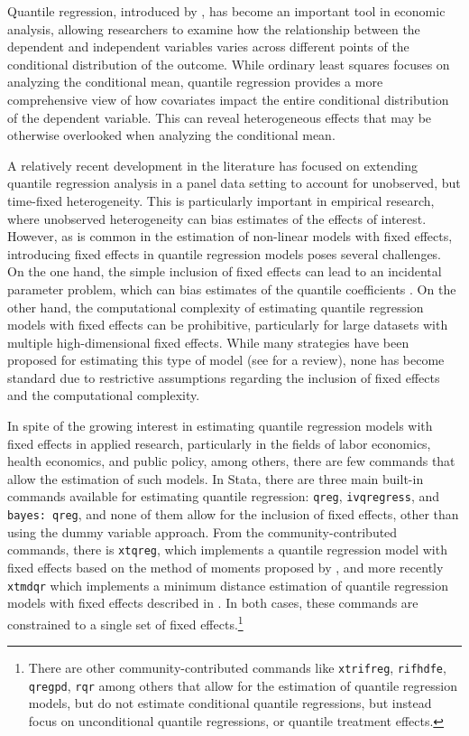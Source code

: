 \documentclass[bib]{statapress}
\begin{document}
Quantile regression, introduced by \citet{koenker1978}, has become an
important tool in economic analysis, allowing researchers to examine how
the relationship between the dependent and independent variables varies
across different points of the conditional distribution of the outcome.
While ordinary least squares focuses on analyzing the conditional mean,
quantile regression provides a more comprehensive view of how covariates
impact the entire conditional distribution of the dependent variable.
This can reveal heterogeneous effects that may be otherwise overlooked
when analyzing the conditional mean.

A relatively recent development in the literature has focused on
extending quantile regression analysis in a panel data setting to
account for unobserved, but time-fixed heterogeneity. This is
particularly important in empirical research, where unobserved
heterogeneity can bias estimates of the effects of interest. However, as
is common in the estimation of non-linear models with fixed effects,
introducing fixed effects in quantile regression models poses several
challenges. On the one hand, the simple inclusion of fixed effects can
lead to an incidental parameter problem, which can bias estimates of the
quantile coefficients \citep{neymanscott1948, lancaster2000}. On the
other hand, the computational complexity of estimating quantile
regression models with fixed effects can be prohibitive, particularly
for large datasets with multiple high-dimensional fixed effects. While
many strategies have been proposed for estimating this type of model
(see \citet{galvao2017quantile} for a review), none has become standard
due to restrictive assumptions regarding the inclusion of fixed effects
and the computational complexity.

In spite of the growing interest in estimating quantile regression
models with fixed effects in applied research, particularly in the
fields of labor economics, health economics, and public policy, among
others, there are few commands that allow the estimation of such models.
In Stata, there are three main built-in commands available for
estimating quantile regression: \texttt{qreg}, \texttt{ivqregress}, and
\texttt{bayes:\ qreg}, and none of them allow for the inclusion of fixed
effects, other than using the dummy variable approach. From the
community-contributed commands, there is \texttt{xtqreg}, which
implements a quantile regression model with fixed effects based on the
method of moments proposed by \citet{mss2019}, and more recently
\texttt{xtmdqr} which implements a minimum distance estimation of
quantile regression models with fixed effects described in
\citet{melly2023}. In both cases, these commands are constrained to a
single set of fixed effects.\footnote{There are other
  community-contributed commands like \texttt{xtrifreg},
  \texttt{rifhdfe}, \texttt{qregpd}, \texttt{rqr} among others that
  allow for the estimation of quantile regression models, but do not
  estimate conditional quantile regressions, but instead focus on
  unconditional quantile regressions, or quantile treatment effects.}
\end{document}

